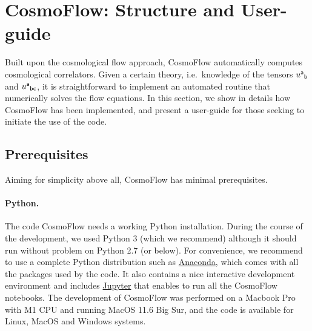 \documentclass[11pt]{article}
\numberwithin{equation}{section} %
\begin{document}
\section{\textsf{CosmoFlow}: Structure and User-guide}
\label{sec: CosmoFlow - Structure and User-guide}

Built upon the cosmological flow approach, \textsf{CosmoFlow} automatically computes cosmological correlators. Given a certain theory, i.e.~knowledge of the tensors $\tensor{u}{^{\sf{a}}}{_{\sf{b}}}$ and $\tensor{u}{^{\sf{a}}}{_{\sf{bc}}}$, it is straightforward to implement an automated routine that numerically solves the flow equations. In this section, we show in details how \textsf{CosmoFlow} has been implemented, and present a user-guide for those seeking to initiate the use of the code. 


\subsection{Prerequisites}

Aiming for simplicity above all, \textsf{CosmoFlow} has minimal prerequisites.

\paragraph{Python.} The code \textsf{CosmoFlow} needs a working Python installation. During the course of the development, we used Python 3 (which we recommend) although it should run without problem on Python 2.7 (or below). For convenience, we recommend to use a complete Python distribution such as \href{https://www.anaconda.com/download}{\textsf{Anaconda}}, which comes with all the packages used by the code. It also contains a nice interactive development environment and includes \href{https://jupyter.org/}{\textsf{Jupyter}} that enables to run all the \textsf{CosmoFlow} notebooks. The development of \textsf{CosmoFlow} was performed on a Macbook Pro with M1 CPU and running MacOS 11.6 Big Sur, and the code is available for Linux, MacOS and Windows systems.
\end{document}
